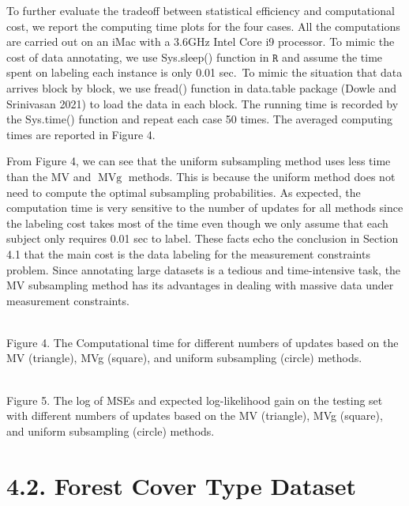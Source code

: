 To further evaluate the tradeoff between statistical efficiency and
computational cost, we report the computing time plots for the four
cases. All the computations are carried out on an iMac with a 3.6GHz
Intel Core i9 processor. To mimic the cost of data annotating, we use
Sys.sleep() function in \(\mathtt { R }\) and assume the time spent on
labeling each instance is only 0.01 sec.~To mimic the situation that
data arrives block by block, we use fread() function in data.table
package (Dowle and Srinivasan 2021) to load the data in each block. The
running time is recorded by the Sys.time() function and repeat each case
50 times. The averaged computing times are reported in Figure 4.

From Figure 4, we can see that the uniform subsampling method uses less
time than the MV and \(\operatorname { M V g }\) methods. This is
because the uniform method does not need to compute the optimal
subsampling probabilities. As expected, the computation time is very
sensitive to the number of updates for all methods since the labeling
cost takes most of the time even though we only assume that each subject
only requires 0.01 sec to label. These facts echo the conclusion in
Section 4.1 that the main cost is the data labeling for the measurement
constraints problem. Since annotating large datasets is a tedious and
time-intensive task, the MV subsampling method has its advantages in
dealing with massive data under measurement constraints.

\\
Figure 4. The Computational time for different numbers of updates based
on the MV (triangle), MVg (square), and uniform subsampling (circle)
methods.

\\
Figure 5. The log of MSEs and expected log-likelihood gain on the
testing set with different numbers of updates based on the MV
(triangle), MVg (square), and uniform subsampling (circle) methods.

\section{4.2. Forest Cover Type
Dataset}\label{forest-cover-type-dataset}

